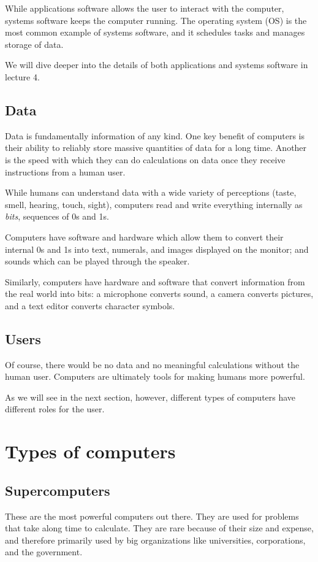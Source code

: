 While applications software allows the user to interact with the computer, systems software keeps the computer running. The operating system (OS) is the most common example of systems software, and it schedules tasks and manages storage of data.

We will dive deeper into the details of both applications and systems software in lecture 4.

\subsection{Data}
Data is fundamentally information of any kind. One key benefit of computers is their ability to reliably store massive quantities of data for a long time. Another is the speed with which they can do calculations on data once they receive instructions from a human user.

While humans can understand data with a wide variety of perceptions (taste,
smell, hearing, touch, sight), computers read and write everything internally as
\textit{bits}, sequences of 0s and 1s.

Computers have software and hardware which allow them to convert their internal 0s and 1s into text, numerals, and images displayed on the monitor; and sounds which can be played through the speaker.

Similarly, computers have hardware and software that convert information from
the real world into bits: a microphone converts sound, a camera converts pictures, and a text editor converts character symbols.

\subsection{Users}
Of course, there would be no data and no meaningful calculations without the human user. Computers are ultimately tools for making humans more powerful.

As we will see in the next section, however, different types of computers have different roles for the user.


\section{Types of computers}

\subsection{Supercomputers}
These are the most powerful computers out there. They are used for problems that take along time to calculate. They are rare because of their size and expense, and therefore primarily used by big organizations like universities, corporations, and the government.

